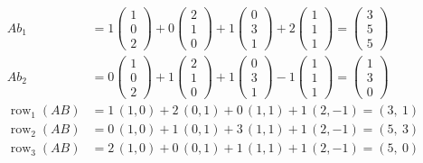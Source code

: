 \documentclass[12pt]{article}
\theoremstyle{definition}
\DeclareMathOperator{\row}{row}
\begin{document}
\begin{board}
\[
\begin{aligned}
Ab_1&=1\begin{pmatrix}1\\0\\2\end{pmatrix}+0\begin{pmatrix}2\\1\\0\end{pmatrix}
+1\begin{pmatrix}0\\3\\1\end{pmatrix}+2\begin{pmatrix}1\\1\\1\end{pmatrix}=\begin{pmatrix}3\\5\\5\end{pmatrix}\\
Ab_2&=0\begin{pmatrix}1\\0\\2\end{pmatrix}+1\begin{pmatrix}2\\1\\0\end{pmatrix}
+1\begin{pmatrix}0\\3\\1\end{pmatrix}-1\begin{pmatrix}1\\1\\1\end{pmatrix}=\begin{pmatrix}1\\3\\0\end{pmatrix}\\
\row_1(AB)&=1\,(1,0)+2\,(0,1)+0\,(1,1)+1\,(2,-1)=(3,\ 1)\\
\row_2(AB)&=0\,(1,0)+1\,(0,1)+3\,(1,1)+1\,(2,-1)=(5,\ 3)\\
\row_3(AB)&=2\,(1,0)+0\,(0,1)+1\,(1,1)+1\,(2,-1)=(5,\ 0)
\end{aligned}
\]
\end{board}
\end{document}
